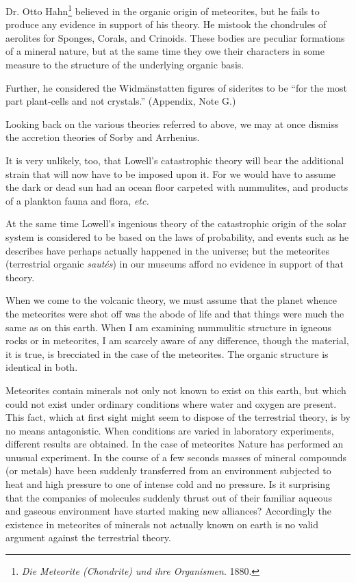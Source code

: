 \documentclass[a4paper, 12pt, oneside]{article}
\begin{document}
Dr. Otto Hahn\footnote{\emph{Die Meteorite (Chondrite) und ihre Organismen}. 1880.} believed in the organic origin of meteorites, but he fails to produce any evidence in support of his theory. He mistook the chondrules of aerolites for Sponges, Corals, and Crinoids. These bodies are peculiar formations of a mineral nature, but at the same time they owe their characters in some measure to the structure of the underlying organic basis.

Further, he considered the Widmänstatten figures of siderites to be ``for the most part plant-cells and not crystals.'' (Appendix, Note G.)

Looking back on the various theories referred to above, we may at once dismiss the accretion theories of Sorby and Arrhenius.

It is very unlikely, too, that Lowell's catastrophic theory will bear the additional strain that will now have to be imposed upon it. For we would have to assume the dark or dead sun had an ocean floor carpeted with nummulites, and products of a plankton fauna and flora, \emph{etc.}

At the same time Lowell's ingenious theory of the catastrophic origin of the solar system is considered to be based on the laws of probability, and events such as he describes have perhaps actually happened in the universe; but the meteorites (terrestrial organic \emph{sautés}) in our museums afford no evidence in support of that theory.

When we come to the volcanic theory, we must assume that the planet whence the meteorites were shot off was the abode of life and that things were much the same as on this earth. When I am examining nummulitic structure in igneous rocks or in meteorites, I am scarcely aware of any difference, though the material, it is true, is brecciated in the case of the meteorites. The organic structure is identical in both.

Meteorites contain minerals not only not known to exist on this earth, but which could not exist under ordinary conditions where water and oxygen are present. This fact, which at first sight might seem to dispose of the terrestrial theory, is by no means antagonistic. When conditions are varied in laboratory experiments, different results are obtained. In the case of meteorites Nature has performed an unusual experiment. In the course of a few seconds masses of mineral compounds (or metals) have been suddenly transferred from an environment subjected to heat and high pressure to one of intense cold and no pressure. Is it surprising that the companies of molecules suddenly thrust out of their familiar aqueous and gaseous environment have started making new alliances? Accordingly the existence in meteorites of minerals not actually known on earth is no valid argument against the terrestrial theory.
\end{document}
